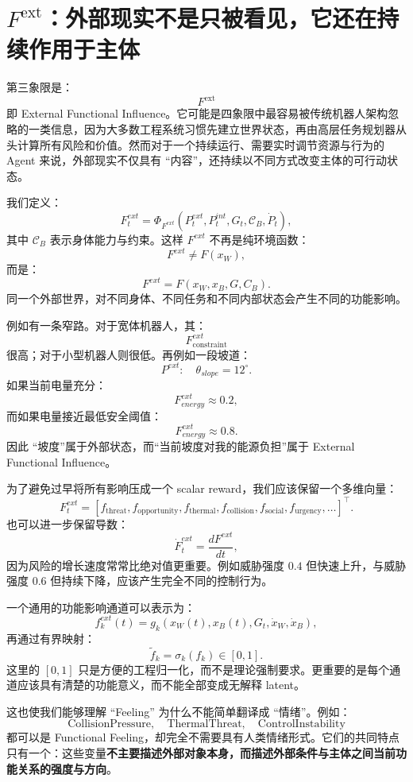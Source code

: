 \section{$F^{\mathrm{ext}}$：外部现实不是只被看见，它还在持续作用于主体}
\label{sec:external-functional-influence}

第三象限是：
\[
\boxed{
F^{\mathrm{ext}}
}
\]
即 External Functional Influence。它可能是四象限中最容易被传统机器人架构忽略的一类信息，因为大多数工程系统习惯先建立世界状态，再由高层任务规划器从头计算所有风险和价值。然而对于一个持续运行、需要实时调节资源与行为的 Agent 来说，外部现实不仅具有 ``内容''，还持续以不同方式改变主体的可行动状态。

我们定义：
\[
F_t^{ext}
=
\Phi_{F^{ext}}
(
P_t^{ext},
P_t^{int},
G_t,
\mathcal C_B,
\dot{P}_t
),
\]
其中 $\mathcal C_B$ 表示身体能力与约束。这样 $F^{ext}$ 不再是纯环境函数：
\[
F^{ext}\neq F(x_W),
\]
而是：
\[
\boxed{
F^{ext}=F(x_W,x_B,G,C_B).
}
\]
同一个外部世界，对不同身体、不同任务和不同内部状态会产生不同的功能影响。

例如有一条窄路。对于宽体机器人，其：
\[
F_{\mathrm{constraint}}^{ext}
\]
很高；对于小型机器人则很低。再例如一段坡道：
\[
P^{ext}:
\quad
\theta_{slope}=12^\circ.
\]
如果当前电量充分：
\[
F^{ext}_{energy}\approx0.2,
\]
而如果电量接近最低安全阈值：
\[
F^{ext}_{energy}\approx0.8.
\]
因此 ``坡度''属于外部状态，而``当前坡度对我的能源负担''属于 External Functional Influence。

为了避免过早将所有影响压成一个 scalar reward，我们应该保留一个多维向量：
\[
F_t^{ext}
=
[
f_{\mathrm{threat}},
f_{\mathrm{opportunity}},
f_{\mathrm{thermal}},
f_{\mathrm{collision}},
f_{\mathrm{social}},
f_{\mathrm{urgency}},
\ldots
]^\top.
\]
也可以进一步保留导数：
\[
\dot{F}_t^{ext}
=
\frac{dF^{ext}}{dt},
\]
因为风险的增长速度常常比绝对值更重要。例如威胁强度 $0.4$ 但快速上升，与威胁强度 $0.6$ 但持续下降，应该产生完全不同的控制行为。

一个通用的功能影响通道可以表示为：
\[
f_k^{ext}(t)
=
g_k(
x_W(t),
x_B(t),
G_t,
\dot{x}_W,
\dot{x}_B
),
\]
再通过有界映射：
\[
\tilde f_k
=
\sigma_k(f_k)
\in[0,1].
\]
这里的 $[0,1]$ 只是方便的工程归一化，而不是理论强制要求。更重要的是每个通道应该具有清楚的功能意义，而不能全部变成无解释 latent。

这也使我们能够理解 ``Feeling'' 为什么不能简单翻译成 ``情绪''。例如：
\[
\mathrm{CollisionPressure},
\quad
\mathrm{ThermalThreat},
\quad
\mathrm{ControlInstability}
\]
都可以是 Functional Feeling，却完全不需要具有人类情绪形式。它们的共同特点只有一个：这些变量\textbf{不主要描述外部对象本身，而描述外部条件与主体之间当前功能关系的强度与方向}。

